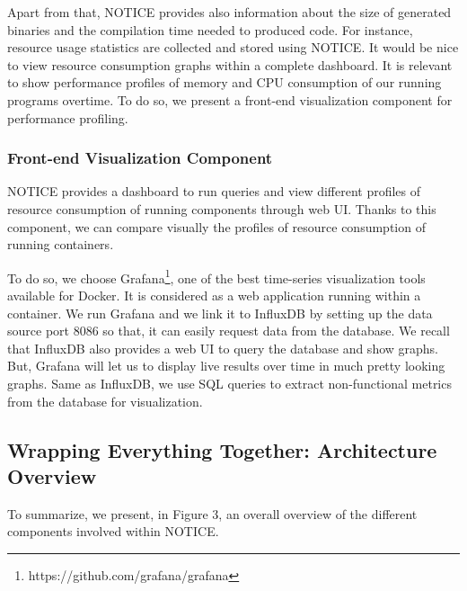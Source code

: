 Apart from that, NOTICE provides also information about the size of generated binaries and the compilation time needed to produced code.
For instance, resource usage statistics are collected and stored using NOTICE. It would be nice to view resource consumption graphs within a complete dashboard. It is relevant to show performance profiles of memory and CPU consumption of our running programs overtime. To do so, we present a front-end visualization component for performance profiling. 

\subsubsection{Front-end Visualization Component}
NOTICE provides a dashboard to run queries and view different profiles of resource consumption of running components through web UI. 
Thanks to this component, we can compare visually the profiles of resource consumption of running containers. 

To do so, we choose Grafana\footnote{https://github.com/grafana/grafana}, one of the best time-series visualization tools available for Docker. It is considered as a web application running within a container. We run Grafana and we link it to InfluxDB by setting up the data source port 8086 so that, it can easily request data from the database. 
We recall that InfluxDB also provides a web UI to query the database and show graphs. But, Grafana will let us to display live results over time in much pretty looking graphs. Same as InfluxDB, we use SQL queries to extract non-functional metrics from the database for visualization.

\subsection{Wrapping Everything Together: Architecture Overview}
To summarize, we present, in Figure 3, an overall overview of the different components involved within NOTICE.

